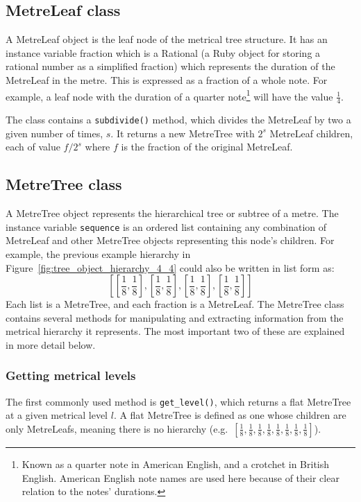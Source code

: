 \documentclass[12pt,twoside,openright]{report}
\begin{document}
\subsection{MetreLeaf class} \label{metreleaf}

A MetreLeaf object is the leaf node of the metrical tree structure. It has an
instance variable fraction which is a Rational (a Ruby object for storing a
rational number as a simplified fraction) which represents the duration of the
MetreLeaf in the metre. This is expressed as a fraction of a whole note. For
example, a leaf node with the duration of a quarter note\footnote{Known as a quarter note in American English, and a crotchet in British English. American English note names are used here because of their clear relation to the notes' durations.} will have the value $\frac{1}{4}$.

The class contains a \verb'subdivide()' method, which divides the MetreLeaf by two a
given number of times, $s$. It returns a new MetreTree with $2^s$ MetreLeaf children, each of value $f/2^s$ where $f$ is the fraction of the original MetreLeaf.


\subsection{MetreTree class} \label{metretree}

A MetreTree object represents the hierarchical tree or subtree of a metre. The
instance variable \verb'sequence' is an ordered list containing any combination of
MetreLeaf and other MetreTree objects representing this node's children. For
example, the previous example hierarchy in Figure~\ref{fig:tree_object_hierarchy_4_4} could also be written in list form as:
\[\left[\left[\frac{1}{8},\frac{1}{8}\right],\left[\frac{1}{8},\frac{1}{8}\right],\left[\frac{1}{8},\frac{1}{8}\right],\left[\frac{1}{8},\frac{1}{8}\right]\right]\]
Each list is a
MetreTree, and each fraction is a MetreLeaf. The MetreTree class contains
several methods for manipulating and extracting information from the metrical
hierarchy it represents. The most important two of these are explained in more
detail below.

\subsubsection{Getting metrical levels} \label{get_level}

The first commonly used method is \verb'get_level()', which returns a flat MetreTree at
a given metrical level $l$. A flat MetreTree is defined as one whose children are
only MetreLeafs, meaning there is no hierarchy (e.g.\ $\left[\frac{1}{8},\frac{1}{8},\frac{1}{8},\frac{1}{8},\frac{1}{8},\frac{1}{8},\frac{1}{8},\frac{1}{8}\right]$).
\end{document}

